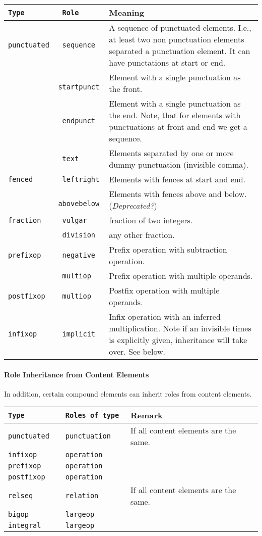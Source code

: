 \documentclass{article}
\def\depr#1{#1 (\textit{Deprecated?})}
\begin{document}
\begin{tabular}{>{\tt}l>{\tt}lp{11cm}}
  Type & Role & Meaning\\\hline
  punctuated & sequence & A sequence of punctuated elements. I.e., at least two non punctuation elements
                          separated a punctuation element. It can have punctations at start or end.\\
       & startpunct & Element with a single punctuation as the front.\\
       & endpunct & Element with a single punctuation as the end. Note, that for elements with
                    punctuations at front and end we get a sequence.\\
       & text & Elements separated by one or more dummy punctuation (invisible comma).\\
  fenced & leftright & Elements with fences at start and end.\\
       & abovebelow & \depr{Elements with fences above and below.} \\
  fraction & vulgar & fraction of two integers.\\
       & division & any other fraction.\\
  prefixop & negative & Prefix operation with subtraction operation.\\
       & multiop & Prefix operation with multiple operands.\\
  postfixop & multiop & Postfix operation with multiple operands.\\
  infixop & implicit & Infix operation with an inferred multiplication. Note if an invisible times 
                       is explicitly given, inheritance will take over. See below.\\
\end{tabular}


\paragraph{Role Inheritance from Content Elements}
In addition, certain compound elements can inherit roles from content elements.

\begin{tabular}{>{\tt}l>{\tt}ll}
  Type & Roles of type & Remark \\\hline
  punctuated & punctuation & If all content elements are the same.\\
  infixop & operation & \\
  prefixop & operation & \\
  postfixop & operation & \\
  relseq & relation & If all content elements are the same.\\
  bigop & largeop & \\
  integral & largeop & \\
\end{tabular}
         
\end{document}
